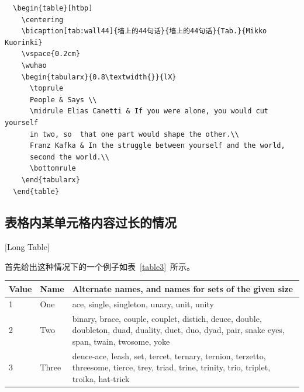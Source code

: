 \begin{lstlisting}
  \begin{table}[htbp]
    \centering
    \bicaption[tab:wall44]{墙上的44句话}{墙上的44句话}{Tab.}{Mikko Kuorinki}
    \vspace{0.2cm}
    \wuhao
    \begin{tabularx}{0.8\textwidth{}}{lX}
      \toprule
      People & Says \\
      \midrule Elias Canetti & If you were alone, you would cut yourself
      in two, so  that one part would shape the other.\\
      Franz Kafka & In the struggle between yourself and the world,
      second the world.\\
      \bottomrule
    \end{tabularx}
  \end{table}
\end{lstlisting}

\subsection{表格内某单元格内容过长的情况}[Long Table]

首先给出这种情况下的一个例子如表~\ref{table3}~所示。
\begin{table}[htbp]
  \centering
  \vspace{0.5em}\wuhao
  \begin{tabularx}{0.7\textwidth}{llX}
    \toprule[1.5pt]
    Value & Name  & Alternate names, and names for sets of the given size                                                                                           \\\midrule[1pt]
    1     & One   & ace, single, singleton, unary, unit, unity                                                                                                      \\
    2     & Two   & binary, brace, couple, couplet, distich, deuce, double, doubleton, duad, duality, duet, duo, dyad, pair, snake eyes, span, twain, twosome, yoke \\
    3     & Three & deuce-ace, leash, set, tercet, ternary, ternion, terzetto, threesome, tierce, trey, triad, trine, trinity, trio, triplet, troika, hat-trick     \\\bottomrule[1.5pt]
  \end{tabularx}
\end{table}

